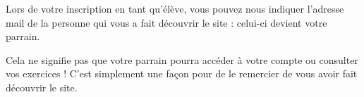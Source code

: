 Lors de votre inscription en tant qu'élève, vous pouvez nous indiquer l'adresse mail de la personne qui vous a fait découvrir le site : celui-ci devient votre \b{parrain}.

Cela ne signifie pas que votre parrain pourra accéder à votre compte ou consulter vos exercices ! C'est simplement une façon pour \eDevoir de le remercier de vous avoir fait découvrir le site.